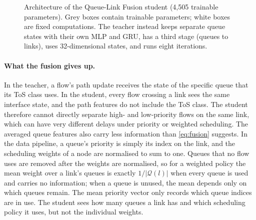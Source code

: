 \begin{figure}[ht]
\caption{Architecture of the Queue-Link Fusion student (4,505 trainable parameters). Grey boxes contain trainable parameters; white boxes are fixed computations. The teacher instead keeps separate queue states with their own MLP and GRU, has a third stage (queues to links), uses 32-dimensional states, and runs eight iterations.}
\label{fig:student-arch}
\end{figure}

\paragraph{What the fusion gives up.} In the teacher, a flow's path update receives the state of the specific queue that its ToS class uses. In the student, every flow crossing a link sees the same interface state, and the path features do not include the ToS class. The student therefore cannot directly separate high- and low-priority flows on the same link, which can have very different delays under priority or weighted scheduling. The averaged queue features also carry less information than \cref{eq:fusion} suggests. In the data pipeline, a queue's priority is simply its index on the link, and the scheduling weights of a node are normalised to sum to one. Queues that no flow uses are removed after the weights are normalised, so for a weighted policy the mean weight over a link's queues is exactly $1/|\mathcal{Q}(l)|$ when every queue is used and carries no information; when a queue is unused, the mean depends only on which queues remain. The mean priority vector only records which queue indices are in use. The student sees how many queues a link has and which scheduling policy it uses, but not the individual weights.

